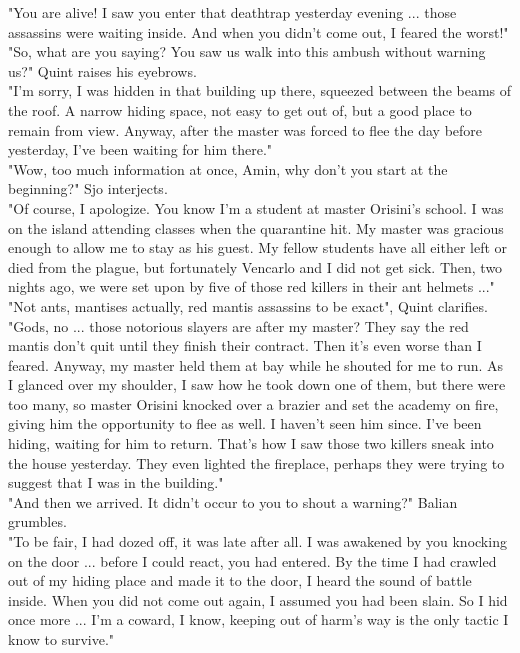 "You are alive! I saw you enter that deathtrap yesterday evening ... those assassins were waiting inside. And when you didn't come out, I feared the worst!"\\

"So, what are you saying? You saw us walk into this ambush without warning us?" Quint raises his eyebrows.\\

"I'm sorry, I was hidden in that building up there, squeezed between the beams of the roof. A narrow hiding space, not easy to get out of, but a good place to remain from view. Anyway, after the master was forced to flee the day before yesterday, I've been waiting for him there."\\

"Wow, too much information at once, Amin, why don't you start at the beginning?" Sjo interjects.\\

"Of course, I apologize. You know I'm a student at master Orisini's school. I was on the island attending classes when the quarantine hit. My master was gracious enough to allow me to stay as his guest. My fellow students have all either left or died from the plague, but fortunately Vencarlo and I did not get sick. Then, two nights ago, we were set upon by five of those red killers in their ant helmets ..."\\

"Not ants, mantises actually, red mantis assassins to be exact", Quint clarifies.\\

"Gods, no ... those notorious slayers are after my master? They say the red mantis don't quit until they finish their contract. Then it's even worse than I feared. Anyway, my master held them at bay while he shouted for me to run. As I glanced over my shoulder, I saw how he took down one of them, but there were too many, so master Orisini knocked over a brazier and set the academy on fire, giving him the opportunity to flee as well. I haven't seen him since. I've been hiding, waiting for him to return. That's how I saw those two killers sneak into the house yesterday. They even lighted the fireplace, perhaps they were trying to suggest that I was in the building."\\

"And then we arrived. It didn't occur to you to shout a warning?" Balian grumbles.\\

"To be fair, I had dozed off, it was late after all. I was awakened by you knocking on the door ... before I could react, you had entered. By the time I had crawled out of my hiding place and made it to the door, I heard the sound of battle inside. When you did not come out again, I assumed you had been slain. So I hid once more ... I'm a coward, I know, keeping out of harm's way is the only tactic I know to survive."\\

